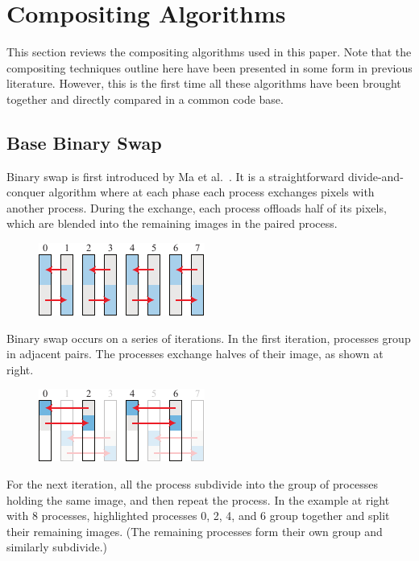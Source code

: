 \documentclass{vgtc}                          %
\newcommand*{\scite}[1]{~\cite{#1}}
\newcommand{\etal}{et al.\xspace}
\begin{document}
\section{Compositing Algorithms}

This section reviews the compositing algorithms used in this paper.
Note that the compositing techniques outline here have been presented in some form in previous literature.
However, this is the first time all these algorithms have been brought together and directly compared in a common code base.

\setlength{\intextsep}{0pt}
\setlength{\columnsep}{2ex}

\subsection{Base Binary Swap}
\label{sec:BinarySwap}

Binary swap is first introduced by Ma \etal\scite{BinarySwap1}.
It is a straightforward divide-and-conquer algorithm where at each phase each process exchanges pixels with another process.
During the exchange, each process offloads half of its pixels, which are blended into the remaining images in the paired process.

\begin{figure}
  \includegraphics[scale=.75]{binary-swap-1}
\end{figure}
Binary swap occurs on a series of iterations.
In the first iteration, processes group in adjacent pairs.
The processes exchange halves of their image, as shown at right.

\begin{figure}
  \includegraphics[scale=.75]{binary-swap-2}
\end{figure}
For the next iteration, all the process subdivide into the group of processes holding the same image, and then repeat the process.
In the example at right with 8 processes, highlighted processes 0, 2, 4, and 6 group together and split their remaining images.
(The remaining processes form their own group and similarly subdivide.)
\end{document}

